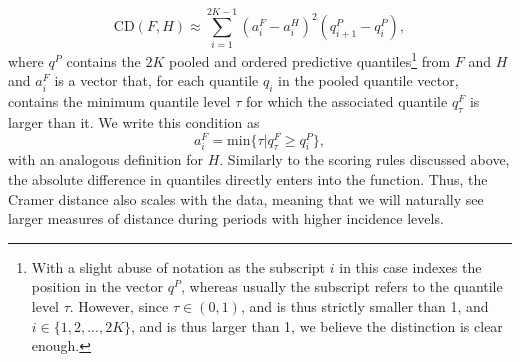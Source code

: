 \begin{equation} \label{eq:cramer}
\text{CD}(F,H) \approx \sum_{i = 1}^{2K-1} (a_i^F - a_i^H)^2 (q_{i+1}^{P} - q_{i}^{P}),
\end{equation} 
where $q^P$ contains the $2K$ pooled and ordered predictive quantiles\footnote{With a slight abuse of notation as the subscript $i$ in this case indexes the position in the vector $q^P$, whereas usually the subscript refers to the quantile level $\tau$. However, since $\tau \in (0,1)$, and is thus strictly smaller than 1, and $i \in \{1,2,...,2K\}$, and is thus larger than 1, we believe the distinction is clear enough.} from $F$ and $H$ and $a_i^F$ is a vector that, for each quantile $q_i$ in the pooled quantile vector, contains the minimum quantile level $\tau$ for which the associated quantile $q_\tau^F$ is larger than it. We write this condition as
\begin{equation*}
a_i^F = \text{min}\{\tau | q_\tau^F \geq q_i^P\},
\end{equation*}
with an analogous definition for $H$. Similarly to the scoring rules discussed above, the absolute difference in quantiles directly enters into the function. Thus, the Cramer distance also scales with the data, meaning that we will naturally see larger measures of distance during periods with higher incidence levels.
